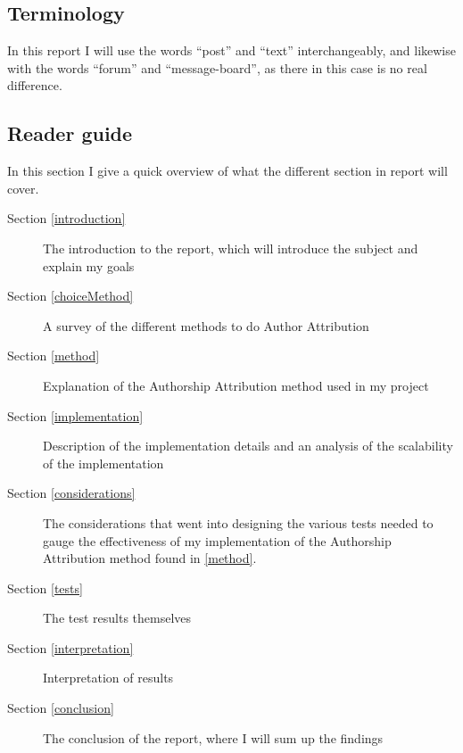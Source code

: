 \subsection{Terminology}
In this report I will use the words ``post'' and ``text'' interchangeably, and likewise with the words ``forum'' and ``message-board'', as there in this case is no real difference. 

\subsection{Reader guide}
In this section I give a quick overview of what the different section in report will cover.
\begin{description}
\item[Section \ref{introduction}] The introduction to the report, which will introduce the subject and explain my goals
\item[Section \ref{choiceMethod}] A survey of the different methods to do Author Attribution  
\item[Section \ref{method}] Explanation of the Authorship Attribution method used in my project
\item[Section \ref{implementation}] Description of the implementation details and an analysis of the scalability of the implementation
\item[Section \ref{considerations}] The considerations that went into designing the various tests needed to gauge the effectiveness of my implementation of the Authorship Attribution method found in \ref{method}.
\item[Section \ref{tests}] The test results themselves
\item[Section \ref{interpretation}] Interpretation of results
\item[Section \ref{conclusion}] The conclusion of the report, where I will sum up the findings  
\end{description}

